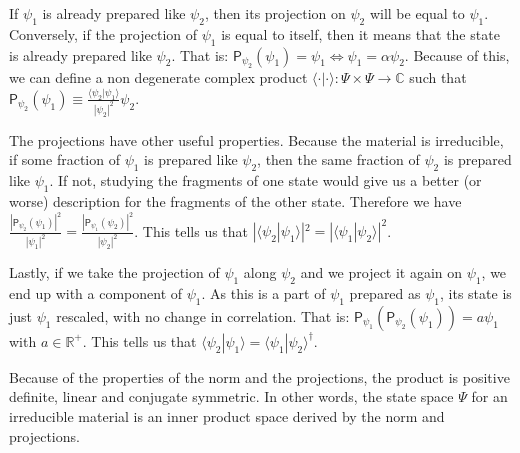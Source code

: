 \documentclass[smallextended]{svjour3}
\numberwithin{equation}{section}
\theoremstyle{definition}
\begin{document}
If $\psi_1$ is already prepared like $\psi_2$, then its projection on $\psi_2$ will be equal to $\psi_1$. Conversely, if the projection of $\psi_1$ is equal to itself, then it means that the state is already prepared like $\psi_2$. That is: $\mathsf{P}_{\psi_2} (\psi_1) = \psi_1 \Leftrightarrow \psi_1 = \alpha \psi_2$. Because of this, we can define a non degenerate complex product $\langle \cdot |\cdot \rangle : \Psi \times \Psi \rightarrow \mathbb{C}$ such that $\mathsf{P}_{\psi_2} (\psi_1) \equiv \frac{\langle \psi_2|\psi_1 \rangle}{|\psi_2|^2} \psi_2$.

The projections have other useful properties. Because the material is irreducible, if some fraction of $\psi_1$ is prepared like $\psi_2$, then the same fraction of $\psi_2$ is prepared like $\psi_1$. If not, studying the fragments of one state would give us a better (or worse) description for the fragments of the other state. Therefore we have $\frac{|\mathsf{P}_{\psi_2} (\psi_1)|^2}{|\psi_1|^2}=\frac{|\mathsf{P}_{\psi_1} (\psi_2)|^2}{|\psi_2|^2}$. This tells us that $|\langle \psi_2|\psi_1 \rangle|^2 = |\langle \psi_1|\psi_2 \rangle|^2$.

Lastly, if we take the projection of $\psi_1$ along $\psi_2$ and we project it again on $\psi_1$, we end up with a component of $\psi_1$. As this is a part of $\psi_1$ prepared as $\psi_1$, its state is just $\psi_1$ rescaled, with no change in correlation. That is: $\mathsf{P}_{\psi_1} (\mathsf{P}_{\psi_2} (\psi_1)) = a \psi_1$ with $a \in \mathbb{R}^+$. This tells us that $\langle \psi_2|\psi_1 \rangle = \langle \psi_1|\psi_2 \rangle^\dagger$.

Because of the properties of the norm and the projections, the product is positive definite, linear and conjugate symmetric. In other words, the state space $\Psi$ for an irreducible material is an inner product space derived by the norm and projections.
 
\end{document}
